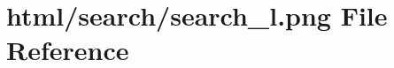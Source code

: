 \hypertarget{search__l_8png}{}\section{html/search/search\+\_\+l.png File Reference}
\label{search__l_8png}
